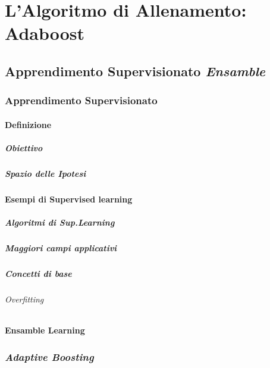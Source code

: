 \chapter{L'Algoritmo di Allenamento: Adaboost}
\label{chap:adaboost}
    \section{Apprendimento Supervisionato \emph{Ensamble}}
    \label{sec:supervised_ensamble_learning}
        \subsection{Apprendimento Supervisionato}
        \label{sub:supervised_learning}
            \subsubsection{Definizione}
                \paragraph{Obiettivo}
                \paragraph{Spazio delle Ipotesi}
            \subsubsection{Esempi di Supervised learning}
                \paragraph{Algoritmi di Sup.Learning}
                \paragraph{Maggiori campi applicativi}
                \paragraph{Concetti di base}
                    \subparagraph{Overfitting}
            \subsubsection{Ensamble Learning}
        \subsection{\emph{Adaptive Boosting}}
        \label{sub:adaptive_boosting}
